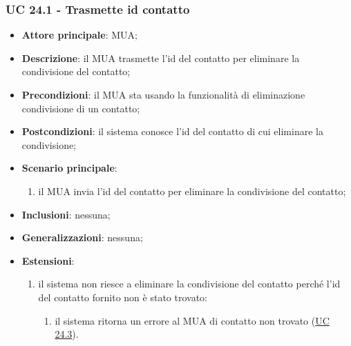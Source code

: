     \subsubsection{UC 24.1 - Trasmette id contatto} \label{sec:UC24.1}
    \begin{itemize}
        \item \textbf{Attore principale}: MUA;
        \item \textbf{Descrizione}: il MUA trasmette l'id del contatto per eliminare la condivisione del contatto;
        \item \textbf{Precondizioni}: il MUA sta usando la funzionalità di eliminazione condivisione di un contatto;
        \item \textbf{Postcondizioni}: il sistema conosce l'id del contatto di cui eliminare la condivisione;
        \item \textbf{Scenario principale}:
            \begin{enumerate}
                \item il MUA invia l'id del contatto per eliminare la condivisione del contatto;
            \end{enumerate}
        \item \textbf{Inclusioni}: nessuna;
        \item \textbf{Generalizzazioni}: nessuna;
        \item \textbf{Estensioni}:
            \begin{enumerate}[label=\alph*.]
                \item il sistema non riesce a eliminare la condivisione del contatto perché l'id del contatto fornito non è stato trovato:
                \begin{enumerate}[label=\arabic*.]
                    \item il sistema ritorna un errore al MUA di contatto non trovato (\hyperref[sec:UC24.3]{UC 24.3}).
                \end{enumerate}
            \end{enumerate}
    \end{itemize}


